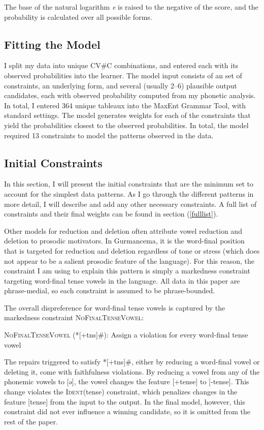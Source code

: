 \documentclass[output=paper,
modfonts
]{langscibook}
\begin{document}
The base of the natural logarithm \textit{e} is raised to the negative of the score, and the probability is calculated over all possible forms. 

\subsection{Fitting the Model}

I split my data into unique CV\#C combinations, and entered each with its observed probabilities into the learner. The model input consists of an set of constraints, an underlying form, and several (usually 2--6) plausible output candidates, each with observed probability computed from my phonetic analysis. In total, I entered 364 unique tableaux into the MaxEnt Grammar Tool, with standard settings. The model generates weights for each of the constraints that yield the probabilities closest to the observed probabilities. In total, the model required 13 constraints to model the patterns observed in the data. 

\subsection{Initial Constraints}
In this section, I will present the initial constraints that are the minimum set to account for the simplest data patterns. As I go through the different patterns in more detail, I will describe and add any other necessary constraints. A full list of constraints and their final weights can be found in section (\ref{fulllist}). 

Other models for reduction and deletion often attribute vowel reduction and deletion to prosodic motivators. In Gurmancema, it is the word-final position that is targeted for reduction and deletion regardless of tone or stress (which does not appear to be a salient prosodic feature of the language). For this reason, the constraint I am using to explain this pattern is simply a markedness constraint targeting word-final tense vowels in the language. All data in this paper are phrase-medial, so each constraint is assumed to be phrase-bounded. 

The overall dispreference for word-final tense vowels is captured by the 
markedness constraint \textsc{NoFinalTenseVowel}:

\ea
\textsc{NoFinalTenseVowel} (*[+tns]\#): Assign a violation for every word-final 	tense vowel
\z

The repairs triggered to satisfy *[+tns]\#, either by reducing a word-final vowel or deleting it, come with faithfulness violations. By reducing a vowel from any of the phonemic vowels to [ə], the vowel changes the feature [+tense] to [-tense]. This change violates the \textsc{Ident}(tense) constraint, which penalizes changes in the feature [tense] from the input to the output. In the final model, however, this constraint did not ever influence a winning candidate, so it is omitted from the rest of the paper.
\end{document}
